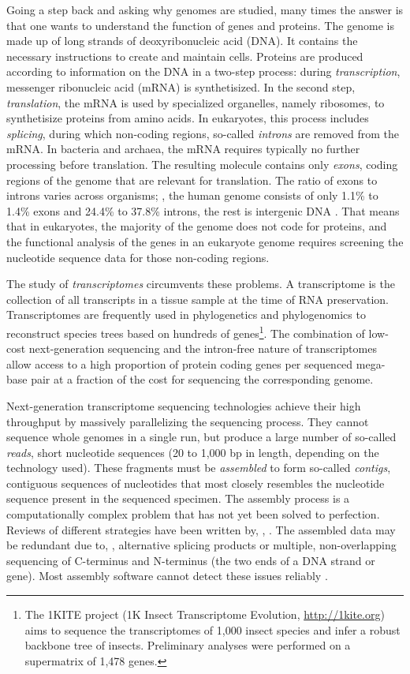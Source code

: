 Going a step back and asking why genomes are studied, many times the answer is
that one wants to understand the function of genes and proteins. The genome is
made up of long strands of deoxyribonucleic acid (DNA). It contains the
necessary instructions to create and maintain cells.  Proteins are produced
according to information on the DNA in a two-step process: during
\emph{transcription}, messenger ribonucleic acid (mRNA) is synthetisized. In the second step, \emph{translation}, the
mRNA is used by specialized organelles, namely ribosomes, to synthetisize
proteins from amino acids. In eukaryotes, this process includes \emph{splicing},
during which non-coding regions, so-called \emph{introns} are removed from the
mRNA. In bacteria and archaea, the mRNA requires typically no further processing
before translation. The resulting molecule contains only \emph{exons}, coding
regions of the genome that are relevant for translation. The ratio of exons to
introns varies across organisms; \eg, the human genome consists of only 1.1\% to
1.4\% exons and 24.4\% to 37.8\% introns, the rest is intergenic DNA
\citep{venter2001}. That means that in eukaryotes, the majority of the genome
does not code for proteins, and the functional analysis of the genes in an
eukaryote genome requires screening the nucleotide sequence data for those
non-coding regions.

The study of \emph{transcriptomes} circumvents these problems. A transcriptome
is the collection of all transcripts in a tissue sample at the time of RNA
preservation.  Transcriptomes are frequently used in phylogenetics and
phylogenomics to reconstruct species trees based on hundreds of
genes\footnote{The 1KITE project (1K Insect Transcriptome Evolution,
\url{http://1kite.org}) aims to sequence the transcriptomes of 1,000 insect
species and infer a robust backbone tree of insects. Preliminary analyses were
performed on a supermatrix of 1,478 genes.}.  The combination of low-cost
next-generation sequencing and the intron-free nature of transcriptomes allow
access to a high proportion of protein coding genes per sequenced mega-base pair
at a fraction of the cost for sequencing the corresponding genome.

Next-generation transcriptome sequencing technologies achieve their high
throughput by massively parallelizing the sequencing process. They cannot
sequence whole genomes in a single run, but produce a large number of so-called
\emph{reads}, short nucleotide sequences (20 to 1,000 bp in length, depending on
the technology used).  These fragments must be \emph{assembled} to form
so-called \emph{contigs}, contiguous sequences of nucleotides that most closely
resembles the nucleotide sequence present in the sequenced specimen. The
assembly process is a computationally complex problem that has not yet been
solved to perfection.  Reviews of different strategies have been written by,
\eg, \citet{zhang2011}.  The assembled data may be redundant due to, \eg,
alternative splicing products \citep{black2003} or multiple, non-overlapping
sequencing of C-terminus and N-terminus (the two ends of a DNA strand or gene).
Most assembly software cannot detect these issues reliably \citep{haiminen2011}. 

